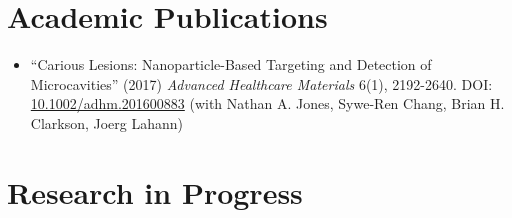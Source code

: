\documentclass{article}[12]
\begin{document}
\section{Academic Publications}

\begin{itemize}
    \item ``Carious Lesions: Nanoparticle-Based Targeting and Detection of Microcavities'' (2017) \emph{Advanced Healthcare Materials} 6(1), 2192-2640. DOI: \url{ 10.1002/adhm.201600883} (with Nathan A. Jones, Sywe-Ren Chang, Brian H. Clarkson, Joerg Lahann)
\end{itemize}

\section{Research in Progress}
\end{document}
